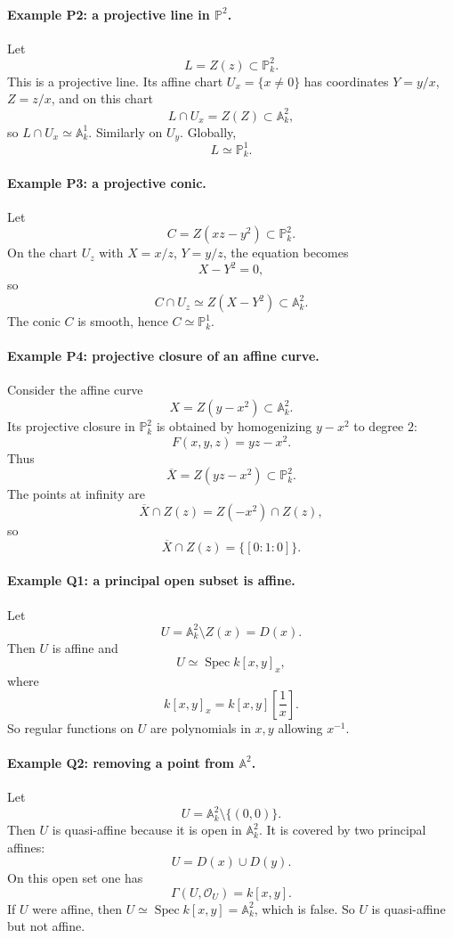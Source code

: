 \documentclass[12pt,a4paper]{article}
\theoremstyle{plain}
\theoremstyle{definition}      %
\begin{document}
\paragraph{Example P2: a projective line in \(\mathbb P^2\).}
Let
\[
L=Z(z)\subset \mathbb P^2_k.
\]
This is a projective line.
Its affine chart \(U_x=\{x\neq 0\}\) has coordinates \(Y=y/x\), \(Z=z/x\), and on this chart
\[
L\cap U_x=Z(Z)\subset \mathbb A^2_k,
\]
so \(L\cap U_x\simeq \mathbb A^1_k\).
Similarly on \(U_y\).
Globally,
\[
L\simeq \mathbb P^1_k.
\]

\paragraph{Example P3: a projective conic.}
Let
\[
C=Z(xz-y^2)\subset \mathbb P^2_k.
\]
On the chart \(U_z\) with \(X=x/z\), \(Y=y/z\), the equation becomes
\[
X-Y^2=0,
\]
so
\[
C\cap U_z\simeq Z(X-Y^2)\subset \mathbb A^2_k.
\]
The conic \(C\) is smooth, hence \(C\simeq \mathbb P^1_k\).

\paragraph{Example P4: projective closure of an affine curve.}
Consider the affine curve
\[
X=Z(y-x^2)\subset \mathbb A^2_k.
\]
Its projective closure in \(\mathbb P^2_k\) is obtained by homogenizing \(y-x^2\) to degree \(2\):
\[
F(x,y,z)=yz-x^2.
\]
Thus
\[
\overline{X}=Z(yz-x^2)\subset \mathbb P^2_k.
\]
The points at infinity are
\[
\overline{X}\cap Z(z)=Z(-x^2)\cap Z(z),
\]
so
\[
\overline{X}\cap Z(z)=\{[0:1:0]\}.
\]

\paragraph{Example Q1: a principal open subset is affine.}
Let
\[
U=\mathbb A^2_k\setminus Z(x)=D(x).
\]
Then \(U\) is affine and
\[
U\simeq \operatorname{Spec}k[x,y]_x,
\]
where
\[
k[x,y]_x
=
k[x,y]\left[\frac{1}{x}\right].
\]
So regular functions on \(U\) are polynomials in \(x,y\) allowing \(x^{-1}\).

\paragraph{Example Q2: removing a point from \(\mathbb A^2\).}
Let
\[
U=\mathbb A^2_k\setminus\{(0,0)\}.
\]
Then \(U\) is quasi-affine because it is open in \(\mathbb A^2_k\).
It is covered by two principal affines:
\[
U=D(x)\cup D(y).
\]
On this open set one has
\[
\Gamma(U,\mathcal O_U)=k[x,y].
\]
If \(U\) were affine, then \(U\simeq \operatorname{Spec}k[x,y]=\mathbb A^2_k\), which is false.
So \(U\) is quasi-affine but not affine.
\end{document}
